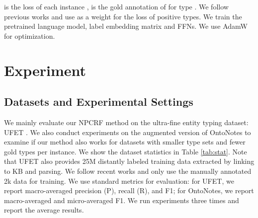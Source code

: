 \documentclass[11pt]{article}
\begin{document}
 is the loss of each instance ,  is the gold annotation of  for type . We follow previous works \cite{ufet,mlmet} and use  as a weight for the loss of positive types. 
We train the pretrained language model, label embedding matrix  and FFNs.
We use AdamW \cite{loshchilov2018fixing} for optimization. \section{Experiment}
\subsection{Datasets and Experimental Settings}
We mainly evaluate our NPCRF method on the ultra-fine entity typing dataset: UFET \cite{ufet}. We also conduct experiments on the augmented version \cite{ufet} of OntoNotes \cite{ontonotes} to examine if our method also works for datasets with smaller type sets and fewer gold types per instance. We show the dataset statistics in Table \ref{tab:stat}. Note that UFET also provides 25M distantly labeled training data extracted by linking to KB and parsing. We follow recent works \cite{dfet,liu-etal-2021-fine} and only use the manually annotated 2k data for training. We use standard metrics for evaluation: for UFET, we report macro-averaged precision (P), recall (R), and F1; for OntoNotes, we report macro-averaged and micro-averaged F1. We run experiments three times and report the average results.

\begin{table}[h]
\caption{ denotes the size of the type set,  denotes the average number of gold types per instance.}
\label{tab:stat}
\end{table}
\end{document}
